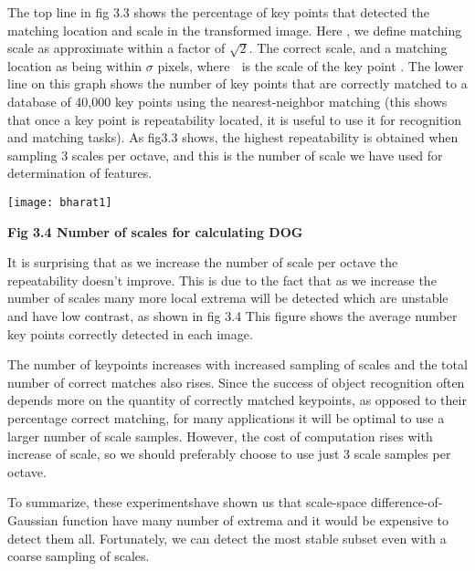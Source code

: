 \documentclass[12pt,a4paper]{report}
\begin{document}
\begin{flushleft}
\vspace{10mm}
The top line in fig 3.3 shows  the percentage of key points that  detected the  matching location and scale in the transformed image. Here , we define matching scale as approximate within a factor of $\sqrt{2}$. The correct scale, and a matching location as being within $\sigma$ pixels, where  is the scale of the key point . The lower line on this graph shows the number of key points that are correctly matched to a database of 40,000 key points using the nearest-neighbor matching (this shows that once a  key point is repeatability  located, it is useful to use it for  recognition and matching tasks). As fig3.3 shows, the highest repeatability is obtained when sampling 3 scales per octave, and this is the number of scale we have used for determination of features.\par
\vspace{10mm}
\begin{center}\texttt{[image: bharat1]}\end{center}

\begin{center}\textbf{Fig 3.4 Number of scales for  calculating DOG}\end{center}

\vspace{10mm}

It is surprising that as we increase the number of scale per octave the repeatability doesn't improve. This is due to the fact that as we increase the number of scales many more local extrema will be detected which are unstable and have low contrast, as  shown in fig 3.4 
This figure shows the average number key points correctly detected in  each image.\par
\vspace{10mm}

The number of keypoints increases with increased sampling of scales and the total number of correct matches also rises. Since the success of object recognition often depends more on the quantity of correctly matched keypoints, as opposed to their percentage correct matching, for many applications it will be optimal to use a larger number of scale samples. However, the cost of computation rises with increase of scale, so we should preferably  choose to use just 3 scale samples per octave.\par

\vspace{10mm}
To summarize, these experimentshave shown us that scale-space difference-of-Gaussian function have many number of extrema and  it would be expensive to detect them all. Fortunately, we can detect the most stable subset even with a coarse sampling of scales.\par


\end{flushleft}
\end{document}
